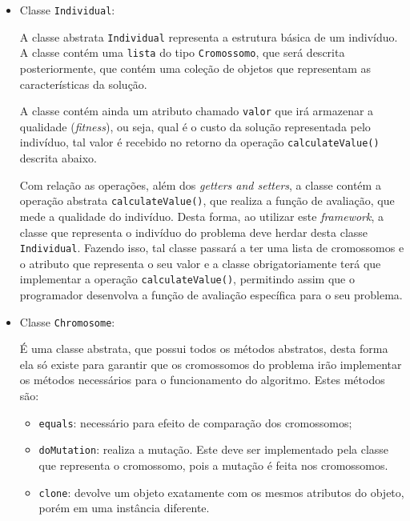 \begin{itemize}
\begin{itemize}
	\end{itemize}
	
	\item Classe \texttt{Individual}:
	\par A classe abstrata \texttt{Individual} representa a estrutura básica de um indivíduo. 
	A classe contém uma \texttt{lista} do tipo 
	\texttt{Cromossomo}, que será descrita posteriormente, que contém uma coleção
	de objetos que representam as características da solução.
	
	\par A classe contém ainda um atributo chamado \texttt{valor} que irá armazenar a qualidade (\textit{fitness}), ou seja, qual é o custo
	da solução representada pelo indivíduo, tal valor é recebido no retorno da
	operação \texttt{calculateValue()} descrita abaixo.
	
	\par Com relação as operações, além dos \textit{getters and setters}, a classe contém a operação abstrata 
	\texttt{calculateValue()}, que realiza a função de avaliação, que mede a qualidade do indivíduo. Desta forma, ao utilizar este \textit{framework}, a classe que representa o indivíduo do 
	problema deve herdar desta classe  \texttt{Individual}. Fazendo isso, tal classe passará a ter uma lista de cromossomos 
	e o atributo que representa o seu valor e a classe obrigatoriamente terá que implementar a operação 
	\texttt{calculateValue()}, permitindo assim que o programador 
	desenvolva a função de avaliação específica para o seu problema.
	
	
	\item Classe \texttt{Chromosome}:
	\par É uma classe abstrata, que possui todos os métodos abstratos, desta forma
	ela só existe para garantir que os cromossomos do problema irão implementar os
	métodos necessários para o funcionamento do algoritmo. Estes métodos são:
	
	\begin{itemize}
		
		\item \texttt{equals}: necessário para efeito de comparação dos cromossomos;
		
		\item \texttt{doMutation}: realiza a mutação. Este deve
		ser implementado pela classe que representa o cromossomo, pois a
		mutação é feita nos cromossomos.
		
		\item \texttt{clone}: devolve um objeto exatamente com os mesmos
		atributos do objeto, porém em uma instância diferente.
		

\end{itemize}
\end{itemize}

